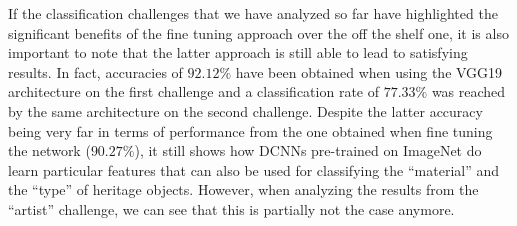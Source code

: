 \documentclass[runningheads]{llncs}
\begin{document}
If the classification challenges that we have analyzed so far have highlighted the significant benefits of the fine tuning approach over the off the shelf one, it is also important to note that the latter approach is still able to lead to satisfying results. In fact, accuracies of $92.12\%$ have been obtained when using the VGG19 architecture on the first challenge and a classification rate of $77.33\%$ was reached by the same architecture on the second challenge. Despite the latter accuracy being very far in terms of performance from the one obtained when fine tuning the network ($90.27\%$), it still shows how DCNNs pre-trained on ImageNet do learn particular features that can also be used for classifying the ``material'' and the ``type'' of heritage objects. However, when analyzing the results from the ``artist'' challenge, we can see that this is partially not the case anymore.
  
\end{document}
